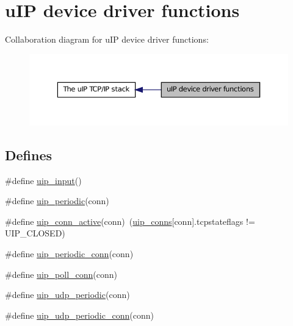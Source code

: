 \hypertarget{group__uipdevfunc}{
\section{uIP device driver functions}
\label{group__uipdevfunc}
}


Collaboration diagram for uIP device driver functions:
\nopagebreak
\begin{figure}[H]
\begin{center}
\leavevmode
\includegraphics[width=370pt]{group__uipdevfunc}
\end{center}
\end{figure}


\subsection*{Defines}
\begin{DoxyCompactItemize}
\item 
\#define \hyperlink{group__uipdevfunc_gaa4360412ee9350fba725f98a137169fe}{uip\_\-input}()
\item 
\#define \hyperlink{group__uipdevfunc_ga1024f8a5fa65e82bf848b2e6590d9628}{uip\_\-periodic}(conn)
\item 
\#define \hyperlink{group__uipdevfunc_gafd5ebb56a1bd1da9878aa886a2075e80}{uip\_\-conn\_\-active}(conn)~(\hyperlink{group__uip_gaf703683056d2bfa5c81fa157dcb20fe2}{uip\_\-conns}\mbox{[}conn\mbox{]}.tcpstateflags != UIP\_\-CLOSED)
\item 
\#define \hyperlink{group__uipdevfunc_gabaf0bb2b6a4424b4eb69e45e457c2583}{uip\_\-periodic\_\-conn}(conn)
\item 
\#define \hyperlink{group__uipdevfunc_gaf20aaf4292cb0d2a1b10bc0a568b51fa}{uip\_\-poll\_\-conn}(conn)
\item 
\#define \hyperlink{group__uipdevfunc_ga2c64c8c36bc84f9336f6a2184ea51883}{uip\_\-udp\_\-periodic}(conn)
\item 
\#define \hyperlink{group__uipdevfunc_gaf5c2ad5acf3cc23b8262e9ba6a15136b}{uip\_\-udp\_\-periodic\_\-conn}(conn)
\end{DoxyCompactItemize}
